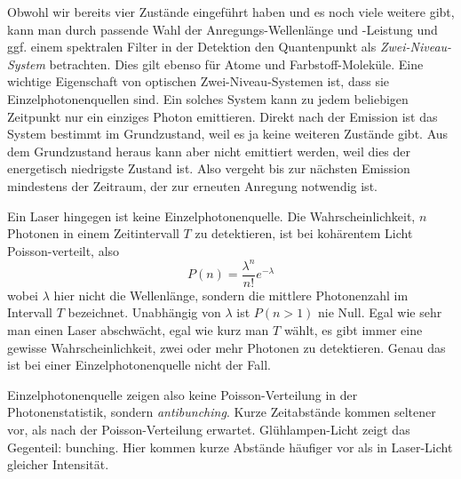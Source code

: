 Obwohl wir bereits vier Zustände eingeführt haben und es noch viele weitere gibt, kann man durch passende Wahl der Anregungs-Wellenlänge und -Leistung und ggf. einem spektralen Filter in der Detektion den Quantenpunkt als \emph{Zwei-Niveau-System} betrachten. Dies gilt ebenso für Atome und Farbstoff-Moleküle. Eine wichtige Eigenschaft von optischen Zwei-Niveau-Systemen ist, dass sie Einzelphotonenquellen sind. Ein solches System kann zu jedem beliebigen Zeitpunkt nur ein einziges Photon emittieren. Direkt nach der Emission ist das System bestimmt im Grundzustand, weil es ja keine weiteren Zustände gibt. Aus dem Grundzustand heraus kann aber nicht emittiert werden, weil dies der energetisch niedrigste Zustand ist. Also vergeht bis zur nächsten Emission mindestens der Zeitraum, der zur erneuten Anregung notwendig ist. 

Ein Laser hingegen ist keine Einzelphotonenquelle. Die Wahrscheinlichkeit, $n$ Photonen in einem Zeitintervall $T$ zu detektieren, ist bei kohärentem Licht Poisson-verteilt, also 
\begin{equation}
    P(n) = \frac{ \lambda^n}{n!} e^{-\lambda}
\end{equation}
wobei $\lambda$ hier nicht die Wellenlänge, sondern die mittlere Photonenzahl im Intervall $T$ bezeichnet. Unabhängig von $\lambda$ ist $P(n > 1)$ nie Null. Egal wie sehr man einen Laser abschwächt, egal wie kurz man $T$ wählt, es gibt immer eine gewisse Wahrscheinlichkeit, zwei oder mehr Photonen zu detektieren. Genau das ist bei einer Einzelphotonenquelle nicht der Fall.

Einzelphotonenquelle zeigen also keine Poisson-Verteilung in der Photonenstatistik, sondern \emph{antibunching}. Kurze Zeitabstände kommen seltener vor, als nach der Poisson-Verteilung erwartet. Glühlampen-Licht zeigt das Gegenteil: bunching. Hier kommen kurze Abstände häufiger vor als in Laser-Licht gleicher Intensität.


